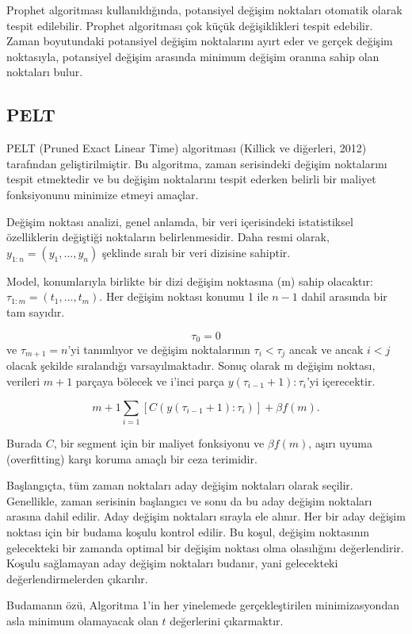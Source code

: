 \documentclass[12pt,twoside]{deuthesis}
\begin{document}
Prophet algoritması kullanıldığında, potansiyel değişim noktaları otomatik olarak tespit edilebilir. Prophet algoritması çok küçük değişiklikleri tespit edebilir. Zaman boyutundaki potansiyel değişim noktalarını ayırt eder ve gerçek değişim noktasıyla, potansiyel değişim arasında minimum değişim oranına sahip olan noktaları bulur.

\subsection{PELT}\label{pelt}

PELT (Pruned Exact Linear Time) algoritması (Killick ve diğerleri, 2012) tarafından geliştirilmiştir. Bu algoritma, zaman serisindeki değişim noktalarını tespit etmektedir ve bu değişim noktalarını tespit ederken belirli bir maliyet fonksiyonunu minimize etmeyi amaçlar.

Değişim noktası analizi, genel anlamda, bir veri içerisindeki istatistiksel özelliklerin değiştiği noktaların belirlenmesidir. Daha resmi olarak, \(y_{1:n} = (y_1, \ldots, y_n)\) şeklinde sıralı bir veri dizisine sahiptir.

Model, konumlarıyla birlikte bir dizi değişim noktasına (m) sahip olacaktır: \(\tau_{1:m} = (t_1, \ldots, t_m)\). Her değişim noktası konumu 1 ile \(n - 1\) dahil arasında bir tam sayıdır.

\[ \tau_0 = 0 \] ve \(\tau_{m+1} = n\)'yi tanımlıyor ve değişim noktalarının \(\tau_i < \tau_j\) ancak ve ancak \(i < j\) olacak şekilde sıralandığı varsayılmaktadır. Sonuç olarak m değişim noktası, verileri \(m + 1\) parçaya bölecek ve i'inci parça \(y(\tau_{i-1}+1):\tau_i\)'yi içerecektir.

\[ m+1 \sum_{i=1} [C(y(\tau_{i-1}+1):\tau_i)] + \beta f (m). \]

Burada \(C\), bir segment için bir maliyet fonksiyonu ve \(\beta f(m)\), aşırı uyuma (overfitting) karşı koruma amaçlı bir ceza terimidir.

Başlangıçta, tüm zaman noktaları aday değişim noktaları olarak seçilir. Genellikle, zaman serisinin başlangıcı ve sonu da bu aday değişim noktaları arasına dahil edilir. Aday değişim noktaları sırayla ele alınır. Her bir aday değişim noktası için bir budama koşulu kontrol edilir. Bu koşul, değişim noktasının gelecekteki bir zamanda optimal bir değişim noktası olma olasılığını değerlendirir. Koşulu sağlamayan aday değişim noktaları budanır, yani gelecekteki değerlendirmelerden çıkarılır.

Budamanın özü, Algoritma 1'in her yinelemede gerçekleştirilen minimizasyondan asla minimum olamayacak olan \(t\) değerlerini çıkarmaktır.
\end{document}
